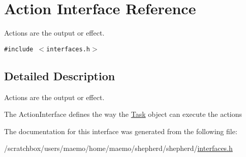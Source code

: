 \hypertarget{interface_action}{
\section{Action Interface Reference}
\label{interface_action}
}
Actions are the output or effect.  


{\tt \#include $<$interfaces.h$>$}



\subsection{Detailed Description}
Actions are the output or effect. 

The ActionInterface defines the way the \hyperlink{class_task}{Task} object can execute the actions 

The documentation for this interface was generated from the following file:\begin{CompactItemize}
\item 
/scratchbox/users/maemo/home/maemo/shepherd/shepherd/\hyperlink{interfaces_8h}{interfaces.h}\end{CompactItemize}
